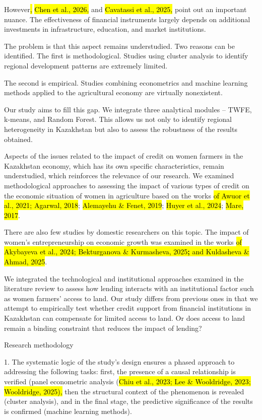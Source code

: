 \documentclass[
]{article}
\newcounter{none} %
\begin{document}
However\hl{,} \hl{Chen et al., 2026,} and \hl{Cavatassi et al., 2025,}
point out an important nuance. The effectiveness of financial
instruments largely depends on additional investments in infrastructure,
education, and market institutions.

The problem is that this aspect remains understudied. Two reasons can be
identified. The first is methodological. Studies using cluster analysis
to identify regional development patterns are extremely limited.

The second is empirical. Studies combining econometrics and machine
learning methods applied to the agricultural economy are virtually
nonexistent.

Our study aims to fill this gap. We integrate three analytical modules
-- TWFE, k-means, and Random Forest. This allows us not only to identify
regional heterogeneity in Kazakhstan but also to assess the robustness
of the results obtained.

Aspects of the issues related to the impact of credit on women farmers
in the Kazakhstan economy, which has its own specific characteristics,
remain understudied, which reinforces the relevance of our research. We
examined methodological approaches to assessing the impact of various
types of credit on the economic situation of women in agriculture based
on the works \hl{of Awuor et al., 2021; Agarwal, 2018}; \hl{Alemayehu \&
Fenet, 2019}; \hl{Huyer et al., 2024}; \hl{Mare, 2017}.

There are also few studies by domestic researchers on this topic. The
impact of women's entrepreneurship on economic growth was examined in
the works \hl{of Akybayeva et al., 2024; Bekturganova \& Kurmasheva,
2025\textbf{;} and Kuldasheva \& Ahmad, 2025}.

We integrated the technological and institutional approaches examined in
the literature review to assess how lending interacts with an
institutional factor such as women farmers' access to land. Our study
differs from previous ones in that we attempt to empirically test
whether credit support from financial institutions in Kazakhstan can
compensate for limited access to land. Or does access to land remain a
binding constraint that reduces the impact of lending?

Research methodology

1. The systematic logic of the study's design ensures a phased approach
to addressing the following tasks: first, the presence of a causal
relationship is verified (panel econometric analysis (\hl{Chiu et al.,
2023; Lee \& Wooldridge, 2023; Wooldridge, 2025),} then the structural
context of the phenomenon is revealed (cluster analysis), and in the
final stage, the predictive significance of the results is confirmed
(machine learning methods).
\end{document}
